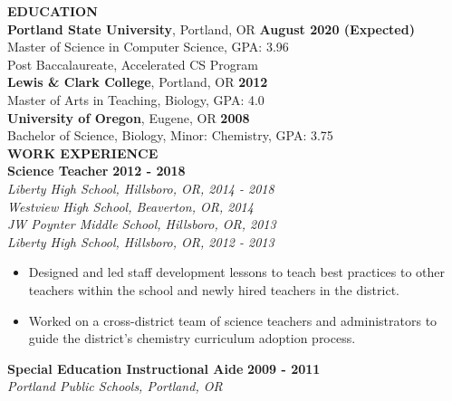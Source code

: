 \documentclass[11pt]{article}
\begin{document}
\noindent
\makebox[0pt][l]{\rule[-.2\baselineskip]{\linewidth}{.3mm}}%
\large{\textbf{EDUCATION}} \smallskip \\
%
\textbf{Portland State University}, Portland, OR
\hfill \textbf{August 2020 (Expected)}\\ 
Master of Science in Computer Science, GPA: 3.96\\
Post Baccalaureate, Accelerated CS Program %
\medskip \\
%
\textbf{Lewis \& Clark College}, Portland, OR
\hfill \textbf{2012} \\
Master of Arts in Teaching, Biology, GPA: 4.0\medskip \\
%
\textbf{University of Oregon}, Eugene, OR
\hfill \textbf{2008}\\
Bachelor of Science, Biology, Minor: Chemistry, GPA: 3.75 \bigskip \\
\makebox[0pt][l]{\rule[-.2\baselineskip]{\linewidth}{.3mm}}%
\large{\textbf{WORK EXPERIENCE}}\smallskip \\
%
\textbf{Science Teacher} \hfill \textbf{2012 - 2018}\\
\textit{Liberty High School, Hillsboro, OR, 2014 - 2018}\\
\textit{Westview High School, Beaverton, OR, 2014}\\
\textit{JW Poynter Middle School, Hillsboro, OR, 2013}\\
\textit{Liberty High School, Hillsboro, OR, 2012 - 2013}
\begin{itemize}[leftmargin=*, itemsep=0pt, topsep=5pt]
	\item Designed and led staff development lessons to teach best practices to other teachers within the school and newly hired teachers in the district.
	\item Worked on a cross-district team of science teachers and administrators to guide the district’s chemistry curriculum adoption process.
\end{itemize}
\medbreak \noindent
%
\textbf{Special Education Instructional Aide} \hfill \textbf{2009 - 2011}\\
\textit{Portland Public Schools, Portland, OR}\\
%
\end{document}
